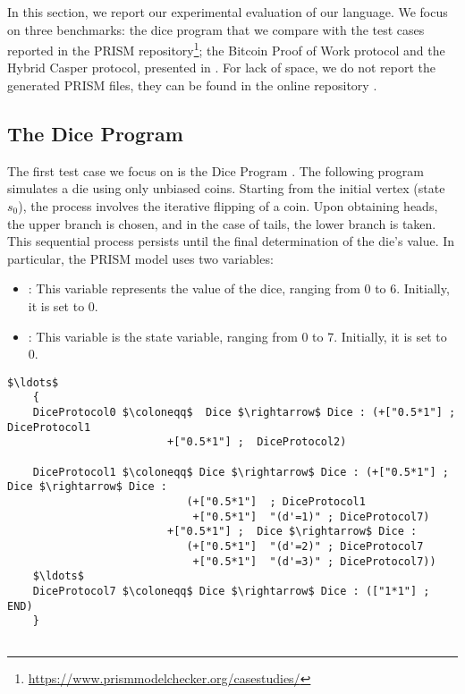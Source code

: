 In  this section, we report our experimental evaluation of our language. 
We focus on three benchmarks: the dice program that we compare with the  
test cases reported in the PRISM repository\footnote{\url{https://www.prismmodelchecker.org/casestudies/}}; 
the Bitcoin Proof of Work protocol and the Hybrid Casper protocol, 
presented in \cite{DBLP:journals/concurrency/BistarelliNGLMV23,DBLP:journals/distribledger/GallettaLMV23}.
For lack of space, we do not report the generated PRISM files, they can be found in the online repository \cite{repository}.

\subsection{The Dice Program}
 The first test case we focus on is the Dice Program \cite{KY76}.
 The following program simulates a die using only unbiased coins. Starting from the initial vertex (state $s_0$), the process involves the iterative flipping of a coin. Upon obtaining heads, the upper branch is chosen, and in the case of tails, the lower branch is taken. This sequential process persists until the final determination of the die's value.
 In particular, the PRISM model uses two variables: 
 \begin{itemize}
	\item {}: This variable represents the value of the dice, ranging from 0 to 6. Initially, it is set to 0.
	\item {}: This variable is the state variable, ranging from 0 to 7. Initially, it is set to 0.
 \end{itemize}
 
 \vspace{-0.25cm}
 \begin{lstlisting}[style=chor-color,caption={Choreography for the Dice Program},captionpos=b,label={ex1-code}]
	$\ldots$
	{
	DiceProtocol0 $\coloneqq$  Dice $\rightarrow$ Dice : (+["0.5*1"] ; DiceProtocol1
						 +["0.5*1"] ;  DiceProtocol2)
	
	DiceProtocol1 $\coloneqq$ Dice $\rightarrow$ Dice : (+["0.5*1"] ; Dice $\rightarrow$ Dice : 
							(+["0.5*1"]  ; DiceProtocol1
							 +["0.5*1"]  "(d'=1)" ; DiceProtocol7)
					     +["0.5*1"] ;  Dice $\rightarrow$ Dice : 
							(+["0.5*1"]  "(d'=2)" ; DiceProtocol7
							 +["0.5*1"]  "(d'=3)" ; DiceProtocol7))
	$\ldots$
	DiceProtocol7 $\coloneqq$ Dice $\rightarrow$ Dice : (["1*1"] ; END)
	}
		
	\end{lstlisting}

